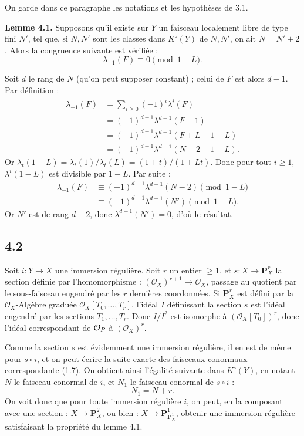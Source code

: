 On garde dans ce paragraphe les notations et les hypothèses de 3.1.

\textbf{Lemme 4.1.} Supposons qu'il existe sur \(Y\) un faisceau localement libre de type fini \(N'\), tel que, si \(N,N'\) sont les classes dans \(K^\circ(Y)\) de \(N,N'\), on ait \(N=N'+2\). Alors la congruence suivante est vérifiée :
\[
  \lambda_{-1}(F)\equiv 0 \pmod{1-L}.
\]

Soit \(d\) le rang de \(N\) (qu'on peut supposer constant) ; celui de \(F\) est alors \(d-1\). Par définition :
\[
\begin{aligned}
\lambda_{-1}(F)
 &= \sum_{i\ge0}(-1)^i\lambda^i(F)\\
 &= (-1)^{d-1}\lambda^{d-1}(F-1)\\
 &= (-1)^{d-1}\lambda^{d-1}(F+L-1-L)\\
 &= (-1)^{d-1}\lambda^{d-1}(N-2+1-L).
\end{aligned}
\]
Or \(\lambda_t(1-L)=\lambda_t(1)/\lambda_t(L)=(1+t)/(1+Lt)\). Donc pour tout \(i\ge1\), \(\lambda^i(1-L)\) est divisible par \(1-L\). Par suite :
\[
\begin{aligned}
\lambda_{-1}(F)
  &\equiv (-1)^{d-1}\lambda^{d-1}(N-2) \pmod{1-L}\\
  &\equiv(-1)^{d-1}\lambda^{d-1}(N') \pmod{1-L}.
\end{aligned}
\]
Or \(N'\) est de
rang \(d-2\), donc \(\lambda^{d-1}(N')=0\), d'où le résultat.

\subsection*{4.2}

Soit \(i:Y\to X\) une immersion régulière. Soit \(r\) un entier \(\ge1\), et \(s:X\longrightarrow \mathbf P_X^r\) la section définie par l'homomorphisme : \((\mathcal O_X)^{r+1}\to\mathcal O_X\), passage au quotient par le sous-faisceau engendré par les \(r\) dernières coordonnées. Si \(\mathbf P_X^r\) est défini par la \(\mathcal O_X\)-Algèbre graduée \(\mathcal O_X[T_0,\ldots,T_r]\), l'idéal \(I\) définissant la section \(s\) est l'idéal engendré par les sections \(T_1,\ldots,T_r\). Donc \(I/I^2\) est isomorphe à \((\mathcal O_X[T_0])^r\), donc l'idéal correspondant de \(\mathcal O_P\) à \((\mathcal O_X)^r\).

Comme la section \(s\) est évidemment une immersion régulière, il en est de même pour \(s\circ i\), et on peut écrire la suite exacte des faisceaux conormaux correspondante (1.7). On obtient ainsi l'égalité suivante dans \(K^\circ(Y)\), en notant \(N\) le faisceau conormal de \(i\), et \(N_1\) le faisceau conormal de \(s\circ i\) :
\[
  N_1=N+r.
\]
On voit donc que pour toute immersion régulière \(i\), on peut, en la composant avec une section : \(X\to\mathbf P_X^2\), ou bien : \(X\to\mathbf P_{\mathbf P_X^1}^{1}\), obtenir une immersion régulière satisfaisant la propriété du lemme 4.1.

